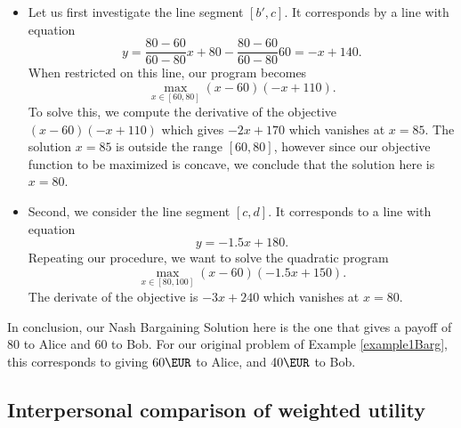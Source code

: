\begin{example}
\begin{itemize}
\item Let us first investigate the line segment $[b',c]$. It corresponds by a line with equation
$$ y = \frac{80 - 60}{60 - 80} x + 80 - \frac{80 - 60}{60 - 80} 60 = - x + 140. $$
When restricted on this line, our program becomes
$$ \max_{x \in [60,80]} (x - 60) (- x + 110). $$
To solve this, we compute the derivative of the objective $(x - 60) (- x + 110)$ which gives $-2x + 170$ which vanishes at $x = 85$.
The solution $x = 85$ is outside the range $[60,80]$, however since our objective function to be maximized is concave, we conclude that the solution here is $x = 80$.
\item Second, we consider the line segment $[c,d]$. It corresponds to a line with equation
$$ y = -1.5 x + 180. $$
Repeating our procedure, we want to solve the quadratic program
$$ \max_{x \in [80,100]} (x - 60) (- 1.5x + 150). $$
The derivate of the objective is $-3x + 240$ which vanishes at $x = 80$.

\end{itemize}

In conclusion, our Nash Bargaining Solution here is the one that gives a payoff of $80$ to Alice and $60$ to Bob. For our original problem of Example \ref{example1Barg}, this corresponds to giving $60 \EUR$ to Alice, and $40 \EUR$ to Bob.


\end{example}

\subsection{Interpersonal comparison of weighted utility} \label{sec:egalitarian-utilitarian}



